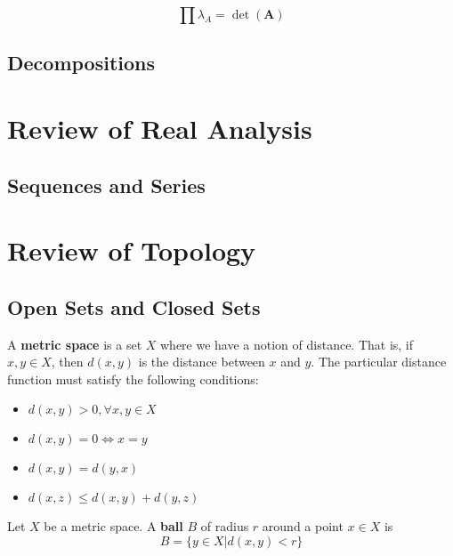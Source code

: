 			\begin{corollary}
				\begin{equation}
					\prod \lambda_A = \det(\mathbf{A})
				\end{equation}
			\end{corollary}


		\section{Decompositions}

	\chapter{Review of Real Analysis}
		\section{Sequences and Series}

	\chapter{Review of Topology}
		\section{Open Sets and Closed Sets}
			\begin{definition}
				A \textbf{metric space} is a set $X$ where we have a notion of distance. That is, if $x, y \in X$, then $d(x, y)$ is the distance between $x$ and $y$. The particular distance function must satisfy the following conditions:
				\begin{itemize}
					\item $d(x, y) > 0, \forall x, y \in X$
					\item $d(x, y) = 0 \iff x=y$
					\item $d(x, y) = d(y, x)$
					\item $d(x, z) \le d(x, y) + d(y, z)$
				\end{itemize}
			\end{definition}

			\begin{definition}[Ball]
				Let $X$ be a metric space. A \textbf{ball} $B$ of radius $r$ around a point $x \in X$ is
				\begin{equation}
					B = \{y \in X|d(x, y) < r\}
				\end{equation}
			\end{definition}

